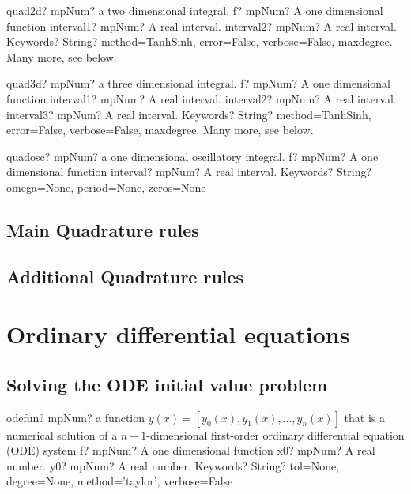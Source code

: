\documentclass[12pt,a4paper,openany]{book}
\begin{document}
\begin{mpFunctionsExtract}
\mpFunctionFour
{quad2d? mpNum? a two dimensional integral.}
{f? mpNum? A one dimensional function}
{interval1? mpNum? A real interval.}
{interval2? mpNum? A real interval.}
{Keywords? String? method=TanhSinh, error=False, verbose=False, maxdegree. Many more, see below.}
\end{mpFunctionsExtract}

\begin{mpFunctionsExtract}
\mpFunctionFive
{quad3d? mpNum? a three dimensional integral.}
{f? mpNum? A one dimensional function}
{interval1? mpNum? A real interval.}
{interval2? mpNum? A real interval.}
{interval3? mpNum? A real interval.}
{Keywords? String? method=TanhSinh, error=False, verbose=False, maxdegree. Many more, see below.}
\end{mpFunctionsExtract}

\begin{mpFunctionsExtract}
\mpFunctionThree
{quadosc? mpNum? a one dimensional oscillatory integral.}
{f? mpNum? A one dimensional function}
{interval? mpNum? A real interval.}
{Keywords? String? omega=None, period=None, zeros=None}
\end{mpFunctionsExtract}

\section{Main Quadrature rules}

\section{Additional Quadrature rules}

\chapter{Ordinary differential equations}

\section{Solving the ODE initial value problem}

\begin{mpFunctionsExtract}
\mpFunctionFour
{odefun? mpNum? a function $y(x) = [y_0(x),y_1(x),\ldots,y_n(x)]$ that is a numerical solution of a $n+1$-dimensional first-order ordinary differential equation (ODE) system}
{f? mpNum? A one dimensional function}
{x0? mpNum? A real number.}
{y0? mpNum? A real number.}
{Keywords? String?  tol=None, degree=None, method='taylor', verbose=False}
\end{mpFunctionsExtract}
\end{document}
